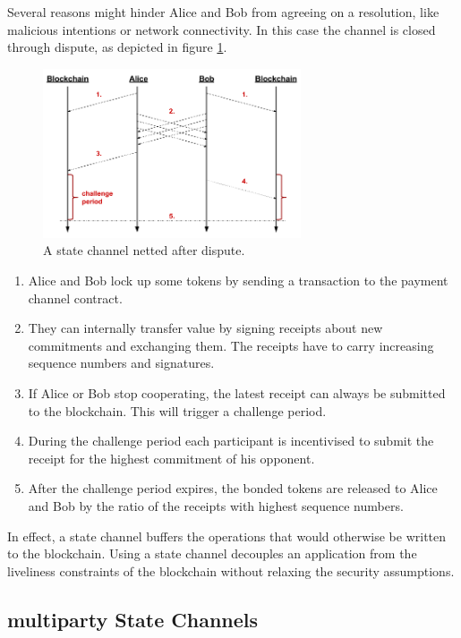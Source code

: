 Several reasons might hinder Alice and Bob from agreeing on a resolution, like malicious intentions or network connectivity. In this case the channel is closed through dispute, as depicted in figure \ref{pc_dispute}.

\begin{figure}[!ht]
\centering
\includegraphics[width=3.0in]{images/dispute.png}
\caption{A state channel netted after dispute.}
\label{pc_dispute}
\end{figure}

\begin{enumerate}
\item Alice and Bob lock up some tokens by sending a transaction to the payment channel contract.
\item They can internally transfer value by signing receipts about new commitments and exchanging them. The receipts have to carry increasing sequence numbers and signatures.
\item If Alice or Bob stop cooperating, the latest receipt can always be submitted to the blockchain. This will trigger a challenge period.
\item During the challenge period each participant is incentivised to submit the receipt for the highest commitment of his opponent.
\item After the challenge period expires, the bonded tokens are released to Alice and Bob by the ratio of the receipts with highest sequence numbers.
\end{enumerate}

In effect, a state channel buffers the operations that would otherwise be written to the blockchain. Using a state channel decouples an application from the liveliness constraints of the blockchain without relaxing the security assumptions.

\subsection{multiparty State Channels}

